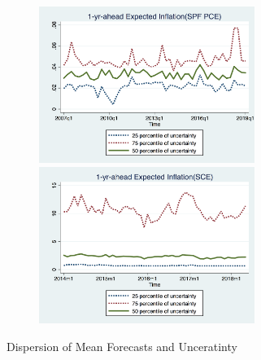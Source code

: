 \documentclass[]{article}
\begin{document}
\begin{figure}[ht]
\begin{subfigure}[b]{0.5\textwidth}
		\smallskip
		\includegraphics[width=7cm]{figures/IQRvarPCEQ.png}
		\smallskip
		\includegraphics[width=7cm]{figures/IQRvarSCEM.png}
		\end{subfigure}
		\caption{Dispersion of Mean Forecasts and Unceratinty }
		\label{IQR_Unceratitny}
	\end{figure}
	
\end{document}
